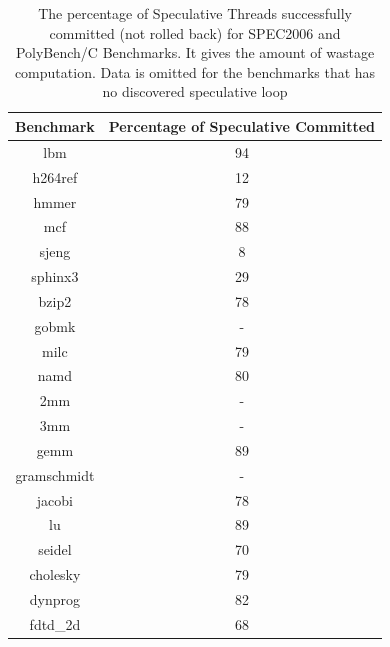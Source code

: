 \documentclass[10pt]{report}          %
\begin{document}
\begin{table}[h]
\centering
\caption{The percentage of Speculative Threads successfully committed (not rolled back) for SPEC2006 and PolyBench/C Benchmarks.  It gives the amount of wastage computation. Data is omitted for the benchmarks that has no discovered speculative loop }
\begin{tabular}{|c||c|} \hline
Benchmark &Percentage of Speculative Committed\\ \hline 
lbm &  94\\ \hline
h264ref & 12  \\ \hline
hmmer &	79	  \\ \hline
mcf & 88 \\ \hline
sjeng &	8 \\ \hline
sphinx3 & 29  \\ \hline
bzip2 & 78  \\ \hline
gobmk & -  \\ \hline
milc & 79  \\ \hline
namd & 80  \\ \hline
2mm	& - \\ \hline
3mm	& - \\ \hline
gemm	 & 89 \\ \hline
gramschmidt	& - \\ \hline
jacobi & 78 \\ \hline
lu	& 89 \\ \hline
seidel&	70 \\ \hline
cholesky & 79 \\ \hline
dynprog & 82 \\ \hline
fdtd\_2d & 68 \\ \hline
\hline\end{tabular}
\label{table:spec_committed}
\end{table}
\end{document}
